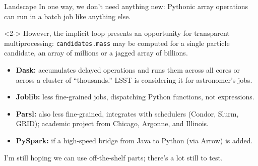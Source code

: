 \documentclass[aspectratio=169]{beamer}
\begin{document}
\begin{frame}{Landscape}
\vspace{0.35 cm}
In one way, we don't need anything new: Pythonic array operations can run in a batch job like anything else.

\vspace{0.35 cm}
\begin{uncoverenv}<2->
However, the implicit loop presents an opportunity for transparent multiprocessing: {\tt\small candidates.mass} may be computed for a single particle candidate, an array of millions or a jagged array of billions.

\vspace{0.25 cm}
\begin{itemize}
\item {\bf Dask:} accumulates delayed operations and runs them across all cores or across a cluster of ``thousands.'' LSST is considering it for astronomer's jobs.
\item {\bf Joblib:} less fine-grained jobs, dispatching Python functions, not expressions.
\item {\bf Parsl:} also less fine-grained, integrates with schedulers (Condor, Slurm, GRID); academic project from Chicago, Argonne, and Illinois.
\item {\bf PySpark:} if a high-speed bridge from Java to Python (via Arrow) is added.
\end{itemize}

\vspace{0.25 cm}
I'm still hoping we can use off-the-shelf parts; there's a lot still to test.
\end{uncoverenv}
\end{frame}
\end{document}
